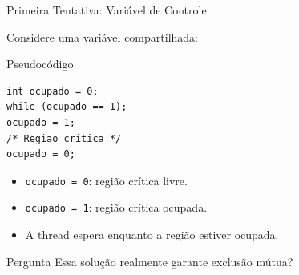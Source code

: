 \documentclass[aspectratio=169,11pt]{beamer}
\begin{document}
\begin{frame}[fragile]{Primeira Tentativa: Variável de Controle}

Considere uma variável compartilhada:

\begin{block}{Pseudocódigo}

\begin{verbatim}
int ocupado = 0;
while (ocupado == 1);
ocupado = 1;
/* Regiao critica */
ocupado = 0;
\end{verbatim}

\end{block}

\vspace{0.3cm}

\begin{itemize}
    \item \texttt{ocupado = 0}: região crítica livre.

    \item \texttt{ocupado = 1}: região crítica ocupada.

    \item A thread espera enquanto a região estiver ocupada.
\end{itemize}

\vspace{0.3cm}

\begin{alertblock}{Pergunta}
Essa solução realmente garante exclusão mútua?
\end{alertblock}

\end{frame}


\end{document}
